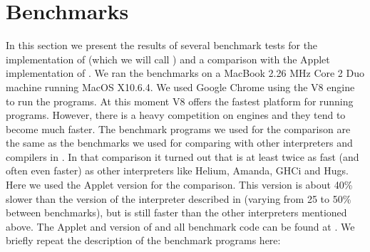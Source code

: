 \section{Benchmarks} \label{sapljs:sec:benchmarks}
In this section we present the results of several benchmark tests for the  \JavaScript implementation of \Sapl (which we will call \Sapljs) and a
comparison with the \Java Applet implementation of \Sapl. 
We ran the benchmarks on a MacBook 2.26 MHz Core 2 Duo machine running MacOS X10.6.4.
We used Google Chrome using the V8 \JavaScript engine to run the programs.
At this moment V8 offers the fastest platform for running \Sapljs programs.
However, there is a heavy competition on \JavaScript engines and they tend to become much faster.
The benchmark programs we used for the comparison are the same as the benchmarks  we used for comparing 
\Sapl with other interpreters and compilers in \cite{JKP}. In that comparison it turned out that \Sapl is at least twice as fast (and often even faster)
as other interpreters like \textsf{Helium}, \textsf{Amanda}, \textsf{GHCi} and \textsf{Hugs}.
Here we used the \Java Applet version for the comparison. This version is about 40\% slower than the \C  version
of the interpreter described in \cite{JKP} (varying from 25 to 50\% between benchmarks), but is still faster than the other interpreters mentioned above.
The \Java Applet and \JavaScript  version of  \Sapl  and all benchmark code can be found at \cite{SAPL}.
We briefly repeat the description of the benchmark programs here:

